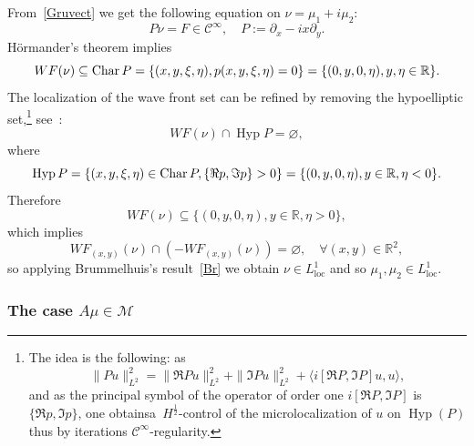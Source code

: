 \documentclass[AHL,Unicode,longabstracts,published]{cedram}
\DeclareMathOperator{\Hyp}{Hyp}
\DeclareMathOperator{\Char}{Char}
\DeclareMathOperator{\locc}{loc}
\newcommand{\bbR}{\mathbb{R}}
\newcommand{\clC}{\mathcal{C}}
\newcommand{\clM}{\mathcal{M}}
\let\originalleft\left
\let\originalright\right
\renewcommand{\left}{\mathopen{}\mathclose\bgroup\originalleft}
\renewcommand{\right}{\aftergroup\egroup\originalright}
\let\oldforall\forall
\renewcommand*{\forall}{\mathrel{\oldforall}}
\begin{document}
From~\eqref{Gruvect} we get the following equation on $\nu=\mu_1+i\mu_2$:
\[
P\nu=F\in \clC^\infty,  \quad P:=\partial_x-ix\partial_y.
\]
H\"ormander's theorem implies
\[
WF(\nu)\subseteq \Char P=\left\{(x,y,\xi,\eta),p(x,y,\xi,\eta)=0\right\}=\left\{(0,y,0,\eta),y,\eta\in\bbR\right\}.
\]
The localization of the wave front set can be refined by removing the hypoelliptic set,\footnote{The idea is the following: as
\[
\|P u\|_{L^2}^2=\|\Re P u\|_{L^2}^2+\|\Im P u\|_{L^2}^2+\langle i[\Re P,\Im P] u, u\rangle,
\]
and as the principal symbol of the operator of order one $i[\Re P,\Im P]$ is $\{\Re p,\Im p\}$, one obtains\linebreak a~$H^\frac 12$-control of the microlocalization of $u$ on $\Hyp(P)$ thus by iterations $\clC^\infty$-regularity.} see~\cite[Theorem~26.3.5]{Ho4}:
\[
WF(\nu)\cap \Hyp P=\varnothing,
\]
where
\[
\Hyp P=\left\{(x,y,\xi,\eta)\in \Char P,\{\Re p,\Im p\}>0\right\}=\left\{(0,y,0,\eta), y\in\bbR,\eta <0\right\}.
\]
Therefore
\[
WF(\nu)\subseteq\{(0,y,0,\eta), y\in\bbR, \eta >0\},
\]
which implies
\[
WF_{(x,y)}(\nu)\cap (-WF_{(x,y)}(\nu))=\varnothing,\quad\forall (x,y)\in\bbR^2,
\]
so applying Brummelhuis's result~\eqref{Br} we obtain $\nu\in L^1_{\locc}$ and so $\mu_1,\mu_2\in L^1_{\locc}$.


\subsubsection{The case \texorpdfstring{$A\mu\in \clM$}{A mu in M}}
\end{document}
